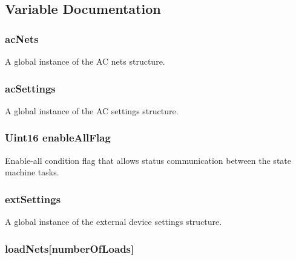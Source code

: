 \subsection{Variable Documentation}
\hypertarget{a00027_ab73a0aedbde1954d7bf8091e07e4675c}{
\subsubsection[{ac\-Nets}]{ ac\-Nets}}\label{a00027_ab73a0aedbde1954d7bf8091e07e4675c}
A global instance of the A\-C nets structure. \hypertarget{a00027_aee11a0ac36813aa41597f992e943cd17}{
\subsubsection[{ac\-Settings}]{ ac\-Settings}}\label{a00027_aee11a0ac36813aa41597f992e943cd17}
A global instance of the A\-C settings structure. \hypertarget{a00027_a65fcb0c0a483e3bc3433b17227fa29ac}{
\subsubsection[{enable\-All\-Flag}]{\setlength{\rightskip}{0pt plus 5cm}Uint16 enable\-All\-Flag}}\label{a00027_a65fcb0c0a483e3bc3433b17227fa29ac}
Enable-\/all condition flag that allows status communication between the state machine tasks. \hypertarget{a00027_ab8092749f4706406bb47ec950573ebed}{
\subsubsection[{ext\-Settings}]{ ext\-Settings}}\label{a00027_ab8092749f4706406bb47ec950573ebed}
A global instance of the external device settings structure. \hypertarget{a00027_a0a6ae344146684f87fe8ca400640dced}{
\subsubsection[{load\-Nets}]{ load\-Nets\mbox{[}number\-Of\-Loads\mbox{]}}}\label{a00027_a0a6ae344146684f87fe8ca400640dced}

